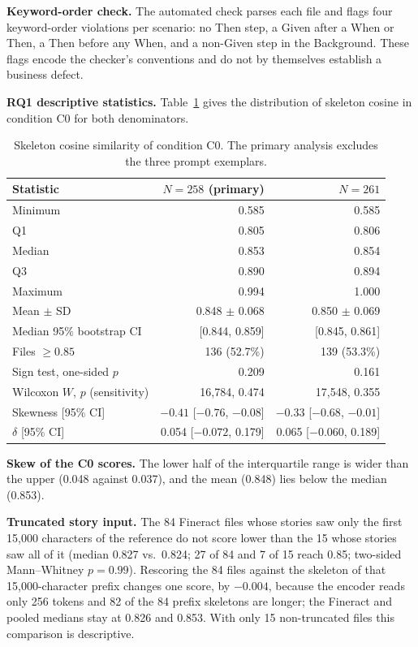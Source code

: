 \textbf{Keyword-order check.} The automated check parses each file and flags four keyword-order violations per scenario: no Then step, a Given after a When or Then, a Then before any When, and a non-Given step in the Background. These flags encode the checker's conventions and do not by themselves establish a business defect.

\textbf{RQ1 descriptive statistics.} Table~\ref{tab:rq1} gives the distribution of skeleton cosine in condition C0 for both denominators.

\begin{table}[!t]
\centering
\caption{Skeleton cosine similarity of condition C0. The primary analysis excludes the three prompt exemplars.}
\label{tab:rq1}
\begin{tabular}{lrr}
\hline
Statistic & $N = 258$ (primary) & $N = 261$\\
\hline
Minimum & 0.585 & 0.585\\
Q1 & 0.805 & 0.806\\
Median & 0.853 & 0.854\\
Q3 & 0.890 & 0.894\\
Maximum & 0.994 & 1.000\\
Mean $\pm$ SD & 0.848 $\pm$ 0.068 & 0.850 $\pm$ 0.069\\
Median 95\% bootstrap CI & [0.844, 0.859] & [0.845, 0.861]\\
Files $\ge 0.85$ & 136 (52.7\%) & 139 (53.3\%)\\
Sign test, one-sided $p$ & 0.209 & 0.161\\
Wilcoxon $W$, $p$ (sensitivity) & 16,784, 0.474 & 17,548, 0.355\\
Skewness [95\% CI] & $-0.41$ [$-0.76$, $-0.08$] & $-0.33$ [$-0.68$, $-0.01$]\\
$\delta$ [95\% CI] & 0.054 [$-0.072$, 0.179] & 0.065 [$-0.060$, 0.189]\\
\hline
\end{tabular}
\end{table}

\textbf{Skew of the C0 scores.} The lower half of the interquartile range is wider than the upper (0.048 against 0.037), and the mean (0.848) lies below the median (0.853).

\textbf{Truncated story input.} The 84 Fineract files whose stories saw only the first 15,000 characters of the reference do not score lower than the 15 whose stories saw all of it (median 0.827 vs.\ 0.824; 27 of 84 and 7 of 15 reach 0.85; two-sided Mann--Whitney $p = 0.99$). Rescoring the 84 files against the skeleton of that 15,000-character prefix changes one score, by $-0.004$, because the encoder reads only 256 tokens and 82 of the 84 prefix skeletons are longer; the Fineract and pooled medians stay at 0.826 and 0.853. With only 15 non-truncated files this comparison is descriptive.

